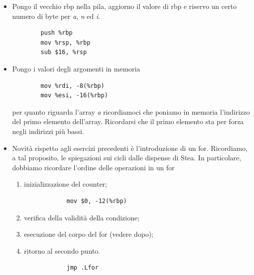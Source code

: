 \begin{itemize}
	\item Pongo il vecchio rbp nella pila, aggiorno il valore di rbp e riservo un certo numero di byte per \emph{a}, \emph{n} ed \emph{i}.
	\begin{verbatim}
		push %rbp
		mov %rsp, %rbp
		sub $16, %rsp
	\end{verbatim}
	\item Pongo i valori degli argomenti in memoria
	\begin{verbatim}
		mov %rdi, -8(%rbp)
		mov %esi, -16(%rbp)
	\end{verbatim}
	per quanto riguarda l'array \emph{a} ricordiamoci che poniamo in memoria l'indirizzo del primo elemento dell'array. Ricordarsi che il primo elemento sta per forza negli indirizzi più bassi.
	\item Novità rispetto agli esercizi precedenti è l'introduzione di un for. Ricordiamo, a tal proposito, le spiegazioni sui cicli dalle dispense di Stea. In particolare, dobbiamo ricordare l'ordine delle operazioni in un for
	\begin{enumerate}
		\item inizializzazione del counter;
		\begin{verbatim}
			mov $0, -12(%rbp)
		\end{verbatim}
		\item verifica della validità della condizione;
		\item esecuzione del corpo del for (vedere dopo);
		\item ritorno al secondo punto.
		\begin{verbatim}
			jmp .Lfor
		\end{verbatim}
	\end{enumerate}
\end{itemize}
